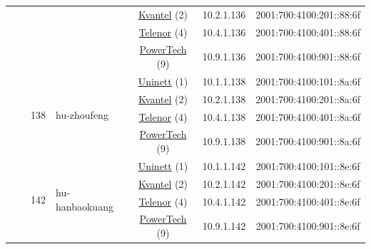 \begin{small}
\begin{center}
\begin{longtable}{|c|c|c|c|c|c|c|c|}
  &  &  &  & \multicolumn{2}{|c|}{\tiny{\href{http://kvantel.no}{Kvantel} (2)}} & \tiny{10.2.1.136} & \tiny{2001:700:4100:201::88:6f} \\* \cline{5-5}\cline{6-6}\cline{7-7}\cline{8-8}
  &  &  &  & \multicolumn{2}{|c|}{\tiny{\href{https://www.telenor.no}{Telenor} (4)}} & \tiny{10.4.1.136} & \tiny{2001:700:4100:401::88:6f} \\* \cline{5-5}\cline{6-6}\cline{7-7}\cline{8-8}
  &  &  &  & \multicolumn{2}{|c|}{\tiny{\href{http://www.powertech.no}{PowerTech} (9)}} & \tiny{10.9.1.136} & \tiny{2001:700:4100:901::88:6f} \\* \cline{3-3}\cline{4-4}\cline{5-5}\cline{6-6}\cline{7-7}\cline{8-8}
  &  & \multirow{4}{*}{\tiny{138}} & \multicolumn{1}{|l|}{\multirow{4}{*}{\tiny{hu-zhoufeng}}} & \multicolumn{2}{|c|}{\tiny{\href{https://www.uninett.no}{Uninett} (1)}} & \tiny{10.1.1.138} & \tiny{2001:700:4100:101::8a:6f} \\* \cline{5-5}\cline{6-6}\cline{7-7}\cline{8-8}
  &  &  &  & \multicolumn{2}{|c|}{\tiny{\href{http://kvantel.no}{Kvantel} (2)}} & \tiny{10.2.1.138} & \tiny{2001:700:4100:201::8a:6f} \\* \cline{5-5}\cline{6-6}\cline{7-7}\cline{8-8}
  &  &  &  & \multicolumn{2}{|c|}{\tiny{\href{https://www.telenor.no}{Telenor} (4)}} & \tiny{10.4.1.138} & \tiny{2001:700:4100:401::8a:6f} \\* \cline{5-5}\cline{6-6}\cline{7-7}\cline{8-8}
  &  &  &  & \multicolumn{2}{|c|}{\tiny{\href{http://www.powertech.no}{PowerTech} (9)}} & \tiny{10.9.1.138} & \tiny{2001:700:4100:901::8a:6f} \\* \cline{3-3}\cline{4-4}\cline{5-5}\cline{6-6}\cline{7-7}\cline{8-8}
  &  & \multirow{4}{*}{\tiny{142}} & \multicolumn{1}{|l|}{\multirow{4}{*}{\tiny{hu-hanbaokuang}}} & \multicolumn{2}{|c|}{\tiny{\href{https://www.uninett.no}{Uninett} (1)}} & \tiny{10.1.1.142} & \tiny{2001:700:4100:101::8e:6f} \\* \cline{5-5}\cline{6-6}\cline{7-7}\cline{8-8}
  &  &  &  & \multicolumn{2}{|c|}{\tiny{\href{http://kvantel.no}{Kvantel} (2)}} & \tiny{10.2.1.142} & \tiny{2001:700:4100:201::8e:6f} \\* \cline{5-5}\cline{6-6}\cline{7-7}\cline{8-8}
  &  &  &  & \multicolumn{2}{|c|}{\tiny{\href{https://www.telenor.no}{Telenor} (4)}} & \tiny{10.4.1.142} & \tiny{2001:700:4100:401::8e:6f} \\* \cline{5-5}\cline{6-6}\cline{7-7}\cline{8-8}
  &  &  &  & \multicolumn{2}{|c|}{\tiny{\href{http://www.powertech.no}{PowerTech} (9)}} & \tiny{10.9.1.142} & \tiny{2001:700:4100:901::8e:6f} \\* \cline{3-3}\cline{4-4}\cline{5-5}\cline{6-6}\cline{7-7}\cline{8-8}

\end{longtable}
\end{center}
\end{small}
